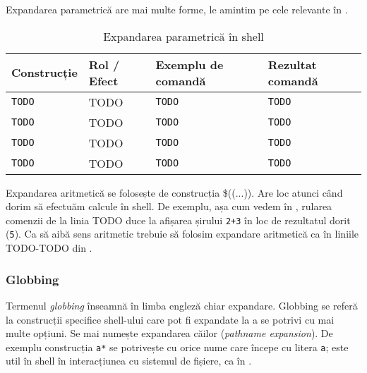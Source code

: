 Expandarea parametrică are mai multe forme, le amintim pe cele relevante în .

\begin{table}[!htb]
  \caption{Expandarea parametrică în shell}
  \begin{center}
    \begin{tabular}{ p{} p{} p{} p{} }
      \toprule
        \textbf{Construcție} &
        \textbf{Rol / Efect} &
        \textbf{Exemplu de comandă } &
        \textbf{Rezultat comandă} \\
      \midrule
        \texttt{TODO} &
        TODO &
        \texttt{TODO} &
        \texttt{TODO} \\

        \texttt{TODO} &
        TODO &
        \texttt{TODO} &
        \texttt{TODO} \\

        \texttt{TODO} &
        TODO &
        \texttt{TODO} &
        \texttt{TODO} \\

        \texttt{TODO} &
        TODO &
        \texttt{TODO} &
        \texttt{TODO} \\

      \bottomrule
    \end{tabular}
    \label{tab:cli:param-expansion}
  \end{center}
\end{table}

Expandarea aritmetică se folosește de construcția \$((...)). Are loc atunci când
dorim să efectuăm calcule în shell. De exemplu, așa cum vedem în , rularea comenzii de la linia TODO duce la afișarea șirului \texttt{2+3} în loc de rezultatul dorit (\texttt{5}).  Ca să aibă sens aritmetic trebuie să folosim expandare aritmetică ca în liniile TODO-TODO din .

\subsubsection{Globbing}
\label{sec:cli-globbing}

Termenul \textit{globbing} înseamnă în limba engleză chiar expandare. Globbing se referă
la construcții specifice shell-ului care pot fi expandate la a se potrivi cu mai
multe opțiuni. Se mai numește expandarea căilor (\textit{pathname expansion}). De exemplu
construcția \texttt{a*} se potrivește cu orice nume care începe cu litera \texttt{a}; este util
în shell în interacțiunea cu sistemul de fișiere, ca în .

